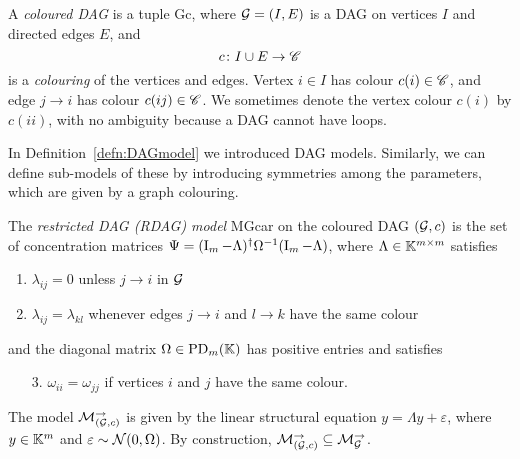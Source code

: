 \begin{defn}\label{defn:ColouredDAG}
	A \emph{coloured DAG} is a tuple \gls{Gc}, where $\mathcal{G} = (I, E)$ is a DAG on vertices $I$ and directed edges $E$, and
	\[ c \colon I \cup E \rightarrow \mathscr{C} \]
	is a \emph{colouring} of the vertices and edges. Vertex $i \in I$ has colour $c(i) \in \mathscr{C}$, and edge $j \to i$ has colour $c(ij) \in \mathscr{C}$. We sometimes denote the vertex colour $c(i)$ by $c(ii)$, with no ambiguity because a DAG cannot have loops.
	\hfill{}
\end{defn}

In Definition~\ref{defn:DAGmodel} we introduced DAG models. Similarly, we can define sub-models of these by introducing symmetries among the parameters, which are given by a graph colouring.

\begin{defn} \label{defn:RDAGmodelViaLDL}
	The {\em restricted DAG (RDAG) model} \gls{MGcar} on the coloured DAG $(\mathcal{G}, c)$ is
	the set of concentration matrices $\Psi = (\operatorname{I}_m - \Lambda)^{\dagger} \Omega^{-1} (\operatorname{I}_m - \Lambda)$,
	where $\Lambda \in \mathbb K^{m \times m}$ satisfies
	\begin{enumerate}
		\item $\lambda_{ij} = 0$ unless $j \to i$ in $\mathcal{G}$
		\item $\lambda_{ij} = \lambda_{kl}$ whenever edges $j \to i$ and $l \to k$ have the same colour
	\end{enumerate}
	and the diagonal matrix $\Omega \in \operatorname{PD}_m(\mathbb K)$ has positive entries and satisfies
	\begin{enumerate}
		\item[3.] $\omega_{ii} = \omega_{jj}$ if vertices $i$ and $j$ have the same colour.
	\end{enumerate}
	The model $\mathcal{M}_{(\mathcal{G}, c)}^{\to}$ is given by the linear structural equation
	$y = \Lambda y + \varepsilon$,
	where $y \in \mathbb K^m$ and $\varepsilon \sim \mathcal{N}(0,\Omega)$. By construction, $\mathcal{M}_{(\mathcal{G}, c)}^{\to} \subseteq \mathcal{M}_{\mathcal{G}}^{\to}$.
	\hfill{}
\end{defn}

